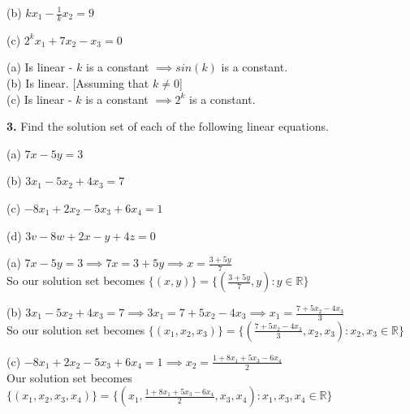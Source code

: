 \documentclass[addpoints]{exam}
\begin{document}
\begin{questions}
    \hspace{3mm} (b) $ kx_1 - \frac{1}{k}x_2 = 9 $

    \hspace{3mm} (c) $ 2^kx_1 + 7x_2 - x_3 = 0 $
    \begin{solution}
        
        (a) Is linear - $k$ is a constant $ \implies sin(k) $ is a constant. \\ 
        (b) Is linear. [Assuming that $k \neq 0$] \\ 
        (c) Is linear - $k$ is a constant $ \implies 2^k $ is a constant. 
    \end{solution}

    \question
    \textbf{3. } Find the solution set of each of the following linear equations. 

    \hspace{3mm} (a) $ 7x - 5y = 3 $

    \hspace{3mm} (b) $ 3x_1 - 5x_2 + 4x_3 = 7 $

    \hspace{3mm} (c) $ -8x_1 + 2x_2 - 5x_3 + 6x_4 = 1 $

    \hspace{3mm} (d) $ 3v - 8w + 2x - y + 4z = 0 $
    \begin{solution}

        (a) $ 7x - 5y = 3 \implies 7x = 3 + 5y \implies x = \frac{3 + 5y}{7} $ \\ %
        So our solution set becomes $ \{ (x, y) \} = \{ (\frac{3 + 5y}{7}, y) : y \in \mathbb{R} \} $ %

        (b) $ 3x_1 - 5x_2 + 4x_3 = 7 \implies 3x_1 = 7 + 5x_2 - 4x_3 \implies x_1 = \frac{7 + 5x_2 -4x_3}{3} $ \\
        So our solution set becomes $ \{ (x_1, x_2, x_3) \} = \{ ( \frac{7 + 5x_2 -4x_3}{3}, x_2, x_3 ) : x_2, x_3 \in \mathbb{R} \}$

        (c) $ -8x_1 + 2x_2 - 5x_3 + 6x_4 = 1 \implies x_2 = \frac{1 + 8x_1 + 5x_3 -6x_4}{2} $ \\ 
        Our solution set becomes $ \{ (x_1, x_2, x_3, x_4) \} = \{ (x_1, \frac{1 + 8x_1 + 5x_3 -6x_4}{2} , x_3, x_4) : x_1, x_3, x_4 \in \mathbb{R} \} $ 


\end{solution}
\end{questions}
\end{document}
